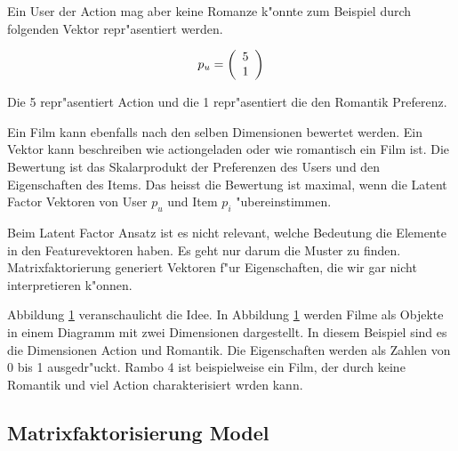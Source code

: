 \documentclass[a4paper, 12pt]{article}
\begin{document}
Ein User der Action mag aber keine Romanze k"onnte zum Beispiel durch folgenden Vektor repr"asentiert werden.

\begin{equation}
  \label{eq:vektor}
  p_u = \left(
  \begin{array}[c]{c}
    5 \\
    1 
  \end{array}
\right)
\end{equation}

Die 5 repr"asentiert Action und die 1 repr"asentiert die den Romantik Preferenz.

 Ein Film kann ebenfalls nach den selben Dimensionen bewertet werden. Ein Vektor kann beschreiben wie actiongeladen oder wie romantisch ein Film ist. Die Bewertung ist das Skalarprodukt der Preferenzen des Users und den Eigenschaften des Items. Das heisst die Bewertung ist maximal, wenn die Latent Factor Vektoren von User $p_u$ und Item $p_i$ "ubereinstimmen.

Beim Latent Factor Ansatz ist es nicht relevant, welche Bedeutung die Elemente in den Featurevektoren haben. Es geht nur darum die Muster zu finden. Matrixfaktorierung generiert Vektoren f"ur Eigenschaften, die wir gar nicht interpretieren k"onnen.

Abbildung \ref{fig:moviedimension} veranschaulicht die Idee. In Abbildung \ref{fig:moviedimension} werden Filme als Objekte in einem Diagramm mit zwei Dimensionen dargestellt. In diesem Beispiel sind es die Dimensionen Action und Romantik. Die Eigenschaften werden als Zahlen von 0 bis 1 ausgedr"uckt. Rambo 4 ist beispielweise ein Film, der durch keine Romantik und viel Action charakterisiert wrden kann.

\begin{figure}
\centering
{}
\label{fig:moviedimension}
\end{figure}


\subsection{Matrixfaktorisierung Model}
\label{sec:matrixfactorizationmodel}
\end{document}
